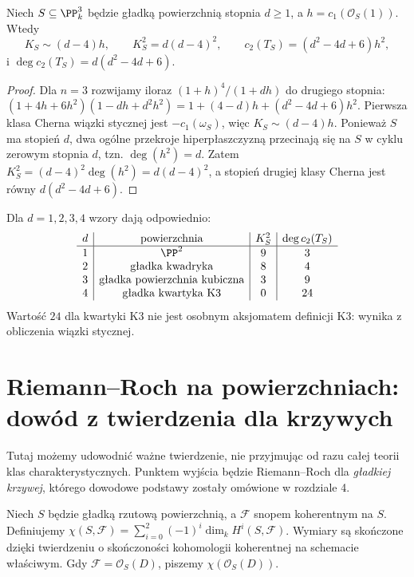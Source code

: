 \begin{wniosek}
\label{wn:ga7-degree-d-surface}
Niech $S\subseteq\PP^3_k$ będzie gładką powierzchnią
stopnia $d\ge1$, a $h=c_1(\mathcal O_S(1))$.
Wtedy
\[
 K_S\sim(d-4)h,\qquad K_S^2=d(d-4)^2,\qquad
 c_2(T_S)=(d^2-4d+6)h^2,
\]
i $\deg c_2(T_S)=d(d^2-4d+6)$.
\end{wniosek}
\begin{proof}
Dla $n=3$ rozwijamy iloraz
$(1+h)^4/(1+dh)$ do drugiego stopnia:
$(1+4h+6h^2)(1-dh+d^2h^2)
=1+(4-d)h+(d^2-4d+6)h^2$.
Pierwsza klasa Cherna wiązki stycznej jest
$-c_1(\omega_S)$, więc $K_S\sim(d-4)h$.
Ponieważ $S$ ma stopień $d$, dwa ogólne przekroje
hiperpłaszczyzną przecinają się na $S$ w cyklu zerowym
stopnia $d$, tzn. $\deg(h^2)=d$.
Zatem $K_S^2=(d-4)^2\deg(h^2)=d(d-4)^2$,
a stopień drugiej klasy Cherna jest równy
$d(d^2-4d+6)$.
\end{proof}

\begin{przyklad}
\label{prz:ga7-surface-invariants}
Dla $d=1,2,3,4$ wzory dają odpowiednio:
\[
\begin{array}{c|c|c|c}
 d & \text{powierzchnia} & K_S^2 & \deg c_2(T_S)\\ \hline
 1 & \PP^2 & 9 & 3\\
 2 & \text{gładka kwadryka} & 8 & 4\\
 3 & \text{gładka powierzchnia kubiczna} & 3 & 9\\
 4 & \text{gładka kwartyka K3} & 0 & 24
\end{array}
\]
Wartość $24$ dla kwartyki K3 nie jest osobnym aksjomatem
definicji K3: wynika z obliczenia wiązki stycznej.
\end{przyklad}

\section{Riemann--Roch na powierzchniach: dowód z twierdzenia dla krzywych}
\label{sec:ga7-rr-surface}

Tutaj możemy udowodnić ważne twierdzenie, nie przyjmując
od razu całej teorii klas charakterystycznych. Punktem wyjścia
będzie Riemann--Roch dla \emph{gładkiej krzywej}, którego
dowodowe podstawy zostały omówione w rozdziale 4.

\begin{definicja}
\label{def:ga7-chi}
Niech $S$ będzie gładką rzutową powierzchnią, a
$\mathcal F$ snopem koherentnym na $S$. Definiujemy
$\chi(S,\mathcal F)=\sum_{i=0}^{2}(-1)^i
\dim_k H^i(S,\mathcal F)$.
Wymiary są skończone dzięki twierdzeniu o skończoności
kohomologii koherentnej na schemacie właściwym.
Gdy $\mathcal F=\mathcal O_S(D)$, piszemy
$\chi(\mathcal O_S(D))$.
\end{definicja}

